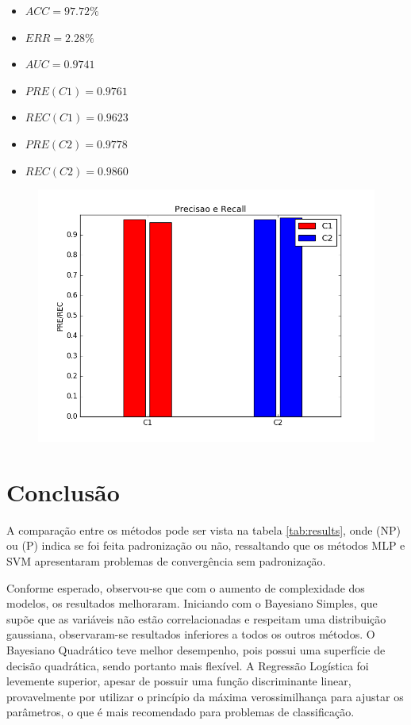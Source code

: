 \documentclass[11pt,a4paper]{article}
\numberwithin{equation}{section}
\begin{document}
\begin{minipage}{.5\textwidth}
\begin{itemize}
\item $ACC = 97.72 \%$
\item $ERR =  2.28 \%$
\item $AUC = 0.9741  $
\item $PRE(C1) = 0.9761$
\item $REC(C1) = 0.9623$
\item $PRE(C2) = 0.9778$
\item $REC(C2) = 0.9860$
\end{itemize}
\end{minipage}%
\begin{minipage}{.5\textwidth}
\begin{figure}[H]
\centering
  \includegraphics[width=\linewidth]{../img/svm.png}
  \label{fig:percep}
\end{figure}
\end{minipage}%

\section{Conclusão}
A comparação entre os métodos pode ser vista na tabela \ref{tab:results}, onde (NP) ou (P) indica se foi feita padronização ou não, ressaltando que os métodos MLP e SVM apresentaram problemas de convergência sem padronização.

Conforme esperado, observou-se que com o aumento de complexidade dos modelos, os resultados melhoraram. Iniciando com o Bayesiano Simples, que supõe que as variáveis não estão correlacionadas e respeitam uma distribuição gaussiana, observaram-se resultados inferiores a todos os outros métodos. O Bayesiano Quadrático teve melhor desempenho, pois possui uma superfície de decisão quadrática, sendo portanto mais flexível. A Regressão Logística foi levemente superior, apesar de possuir uma função discriminante linear, provavelmente por utilizar o princípio da máxima verossimilhança para ajustar os parâmetros, o que é mais recomendado para problemas de classificação. 
\end{document}
